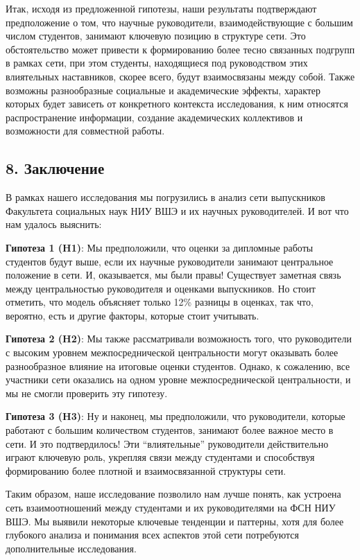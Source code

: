 \documentclass[
]{article}
\begin{document}
Итак, исходя из предложенной гипотезы, наши результаты подтверждают
предположение о том, что научные руководители, взаимодействующие с
большим числом студентов, занимают ключевую позицию в структуре сети.
Это обстоятельство может привести к формированию более тесно связанных
подгрупп в рамках сети, при этом студенты, находящиеся под руководством
этих влиятельных наставников, скорее всего, будут взаимосвязаны между
собой. Также возможны разнообразные социальные и академические эффекты,
характер которых будет зависеть от конкретного контекста исследования, к
ним относятся распространение информации, создание академических
коллективов и возможности для совместной работы.

\hypertarget{ux437ux430ux43aux43bux44eux447ux435ux43dux438ux435}{%
\subsection{8.
Заключение}\label{ux437ux430ux43aux43bux44eux447ux435ux43dux438ux435}}

В рамках нашего исследования мы погрузились в анализ сети выпускников
Факультета социальных наук НИУ ВШЭ и их научных руководителей. И вот что
нам удалось выяснить:

\textbf{Гипотеза 1 (H1)}: Мы предположили, что оценки за дипломные
работы студентов будут выше, если их научные руководители занимают
центральное положение в сети. И, оказывается, мы были правы! Существует
заметная связь между центральностью руководителя и оценками выпускников.
Но стоит отметить, что модель объясняет только 12\% разницы в оценках,
так что, вероятно, есть и другие факторы, которые стоит учитывать.

\textbf{Гипотеза 2 (H2)}: Мы также рассматривали возможность того, что
руководители с высоким уровнем межпосреднической центральности могут
оказывать более разнообразное влияние на итоговые оценки студентов.
Однако, к сожалению, все участники сети оказались на одном уровне
межпосреднической центральности, и мы не смогли проверить эту гипотезу.

\textbf{Гипотеза 3 (H3)}: Ну и наконец, мы предположили, что
руководители, которые работают с большим количеством студентов, занимают
более важное место в сети. И это подтвердилось! Эти ``влиятельные''
руководители действительно играют ключевую роль, укрепляя связи между
студентами и способствуя формированию более плотной и взаимосвязанной
структуры сети.

Таким образом, наше исследование позволило нам лучше понять, как
устроена сеть взаимоотношений между студентами и их руководителями на
ФСН НИУ ВШЭ. Мы выявили некоторые ключевые тенденции и паттерны, хотя
для более глубокого анализа и понимания всех аспектов этой сети
потребуются дополнительные исследования.
\end{document}
